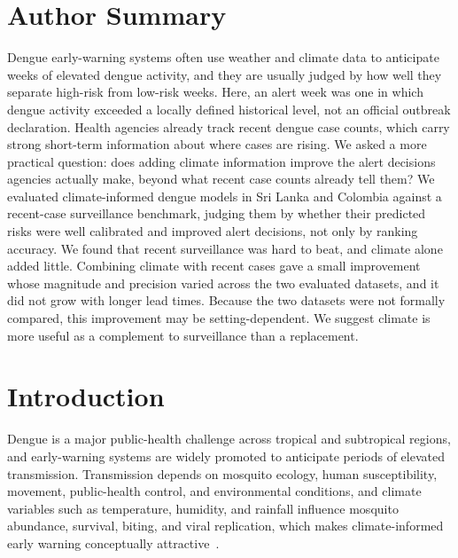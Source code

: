 \documentclass[11pt,a4paper]{article}
\begin{document}
\section*{Author Summary}
Dengue early-warning systems often use weather and climate data to anticipate weeks of elevated dengue activity, and they are usually judged by how well they separate high-risk from low-risk weeks. Here, an alert week was one in which dengue activity exceeded a locally defined historical level, not an official outbreak declaration. Health agencies already track recent dengue case counts, which carry strong short-term information about where cases are rising. We asked a more practical question: does adding climate information improve the alert decisions agencies actually make, beyond what recent case counts already tell them? We evaluated climate-informed dengue models in Sri Lanka and Colombia against a recent-case surveillance benchmark, judging them by whether their predicted risks were well calibrated and improved alert decisions, not only by ranking accuracy. We found that recent surveillance was hard to beat, and climate alone added little. Combining climate with recent cases gave a small improvement whose magnitude and precision varied across the two evaluated datasets, and it did not grow with longer lead times. Because the two datasets were not formally compared, this improvement may be setting-dependent. We suggest climate is more useful as a complement to surveillance than a replacement.

\section{Introduction}

Dengue is a major public-health challenge across tropical and subtropical regions, and early-warning systems are widely promoted to anticipate periods of elevated transmission. Transmission depends on mosquito ecology, human susceptibility, movement, public-health control, and environmental conditions, and climate variables such as temperature, humidity, and rainfall influence mosquito abundance, survival, biting, and viral replication, which makes climate-informed early warning conceptually attractive~\cite{Mordecai2017,Huber2018}.
\end{document}
